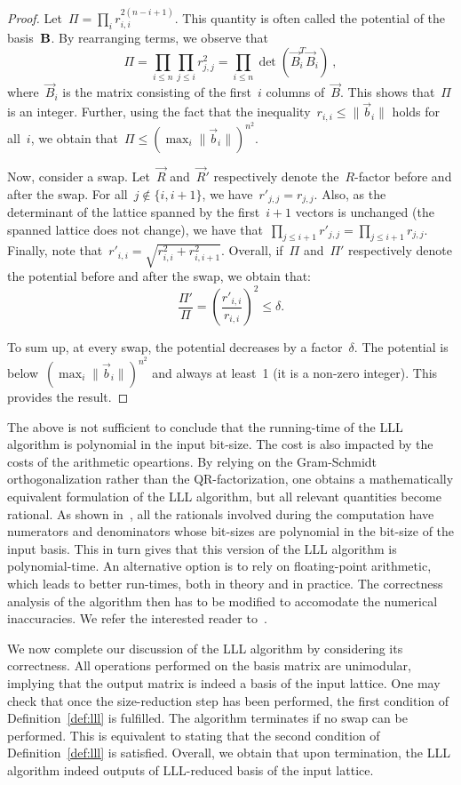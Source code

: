\begin{proof}
Let~$\Pi = \prod_i r_{i,i}^{2(n-i+1)}$. This quantity is often called the potential of the basis~$\bf{B}$. 
By rearranging terms, we observe that
\[
\Pi = \prod_{i\leq n} \prod_{j \leq i} r_{j,j}^2 =  \prod_{i\leq n} \det (\vec{B}_i^T \vec{B}_i) \ ,
\]
where~$\vec{B}_i$ is the matrix consisting of the first~$i$ columns of~$\vec{B}$. This shows that~$\Pi$ is an integer. 
Further, using the fact that the inequality~$r_{i,i} \leq \|\vec{b}_i\|$ holds for all~$i$, we obtain 
that~$\Pi \leq (\max_i \|\vec{b}_i\|)^{n^2}$. 

Now, consider a swap. Let~$\vec{R}$ and~$\vec{R}'$ respectively denote the~$R$-factor before and after the swap. 
For all~$j \notin \{i,i+1\}$, we have~$r'_{j,j} = r_{j,j}$. Also, as the determinant of the lattice spanned by the first~$i+1$ vectors is unchanged (the spanned lattice does not change), we have that~$\prod_{j \leq i+1} r'_{j,j} =  \prod_{j \leq i+1} r_{j,j}$. 
Finally, note that~$r'_{i,i} = \sqrt{r_{i,i}^2 + r_{i,i+1}^2}$. 
Overall, 
if~$\Pi$ and~$\Pi'$ respectively denote the potential before and after the swap, we obtain that:
\[ 
\frac{\Pi'}{\Pi} = \left( \frac{r'_{i,i}}{r_{i,i}}\right)^2  \leq \delta.  
\]

To sum up, at every swap, the potential decreases by a factor~$\delta$. The potential is below~$(\max_i \|\vec{b}_i\|)^{n^2}$ and always at least~1 (it is a non-zero integer). This provides the result. 
\end{proof}

The above is not sufficient to conclude that the running-time of the LLL algorithm is polynomial in the input bit-size. 
The cost is also impacted by the costs of the arithmetic opeartions. By relying on the Gram-Schmidt orthogonalization rather than the
QR-factorization, one obtains a mathematically equivalent formulation of the LLL algorithm, but all relevant quantities become rational. 
As shown in~\cite{LeLeLo82}, all the rationals involved during the computation have numerators and denominators whose bit-sizes 
are polynomial in the bit-size of the input basis. This in turn gives that this version of the LLL algorithm is polynomial-time. 
An alternative option is to rely on floating-point arithmetic, which leads to better run-times, both in theory and in practice. 
The correctness analysis of the algorithm then has to be modified to accomodate the numerical inaccuracies. We refer the interested reader to~\cite{NgSt09}. 
 
We now complete our discussion of the LLL algorithm by considering its correctness. 
All operations performed on the basis matrix are unimodular, implying that the output matrix is indeed a basis of the input lattice. 
One may check that once the size-reduction step has been performed, the first condition of Definition~\ref{def:lll} is fulfilled. 
The algorithm terminates if no swap can be performed. This is equivalent to stating that the second condition of Definition~\ref{def:lll} is satisfied. Overall, we obtain that upon termination, the LLL algorithm indeed outputs of LLL-reduced basis of the input lattice.



